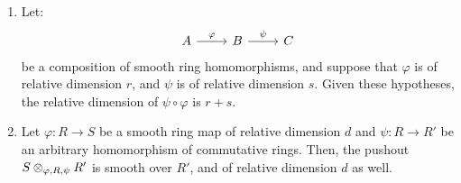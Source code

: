                 \begin{proposition} \label{prop: compositions_and_base_changes_of_smooth_morphisms}
                    \noindent
                    \begin{enumerate}
                        \item Let:
                            $$
                                \begin{tikzcd}
                                	A & B & C
                                	\arrow["\varphi", from=1-1, to=1-2]
                                	\arrow["\psi", from=1-2, to=1-3]
                                \end{tikzcd}
                            $$
                        be a composition of smooth ring homomorphisms, and suppose that $\varphi$ is of relative dimension $r$, and $\psi$ is of relative dimension $s$. Given these hypotheses, the relative dimension of $\psi \circ \varphi$ is $r + s$.
                        \item Let $\varphi: R \to S$ be a smooth ring map of relative dimension $d$ and $\psi: R \to R'$ be an arbitrary homomorphism of commutative rings. Then, the pushout $S \tensor_{\varphi, R, \psi} R'$ is smooth over $R'$, and of relative dimension $d$ as well. 
                    \end{enumerate}
                \end{proposition}
